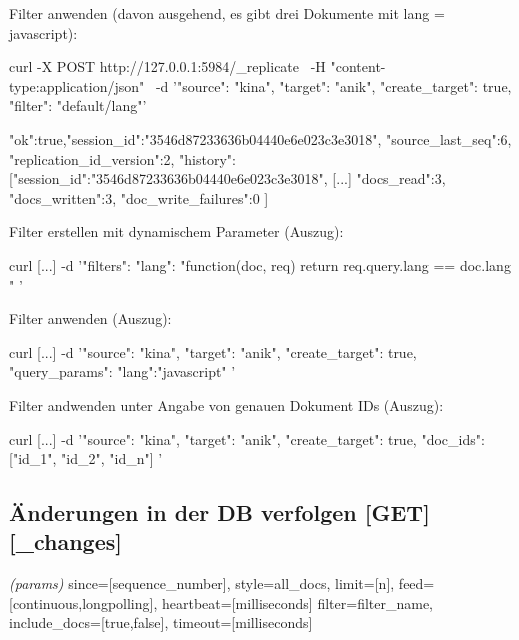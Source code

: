 \documentclass[19pt,landscape,twocolumn]{article}
\newcommand{\htmlverb}[1]{{[}\textbf{{#1}}{]}}
\newcommand{\brackets}[1]{{[}{#1}{]}}
\newcommand{\setparskip}{\setlength{\parskip}{-6mm}}
\newcommand{\resetparskip}{\setlength{\parskip}{1mm}}
\begin{document}
Filter anwenden (davon ausgehend, es gibt drei Dokumente mit lang = javascript):

\begin{code}
curl -X POST http://127.0.0.1:5984/_replicate \
     -H "content-type:application/json" \
     -d '{"source": "kina",
          "target": "anik",
          "create_target": true,
          "filter": "default/lang"}'
\end{code}
\setparskip
\begin{response}
{"ok":true,"session_id":"3546d87233636b04440e6e023c3e3018",
 "source_last_seq":6,
 "replication_id_version":2, "history":
  [{"session_id":"3546d87233636b04440e6e023c3e3018",
    [...]
    "docs_read":3,
    "docs_written":3,
    "doc_write_failures":0
  }]
}
\end{response}
\resetparskip

Filter erstellen mit dynamischem Parameter (Auszug):

\begin{code}
curl [...]
  -d '{"filters":{
       "lang":
         "function(doc, req) {
           return req.query.lang == doc.lang
         }"
       }
    }'
\end{code}

Filter anwenden (Auszug):

\begin{code}
curl [...]
  -d '{"source": "kina",
       "target": "anik",
       "create_target": true,
       "query_params": {
          "lang":"javascript"
       }
     }'
\end{code}

Filter andwenden unter Angabe von genauen Dokument IDs (Auszug):

\begin{code}
curl [...]
  -d '{"source": "kina",
       "target": "anik",
       "create_target": true,
       "doc_ids": ["id_1", "id_2", "id_n"]
     }'
\end{code}

\subsection{Änderungen in der DB verfolgen \htmlverb{GET} \htmlverb{\_changes}}
\emph{(params)} since=\brackets{sequence\_number}, style=all\_docs, limit=\brackets{n}, \newline
feed=\brackets{continuous,longpolling}, heartbeat=\brackets{milliseconds} \newline
filter=filter\_name, include\_docs=\brackets{true,false}, timeout=\brackets{milliseconds}
\end{document}
